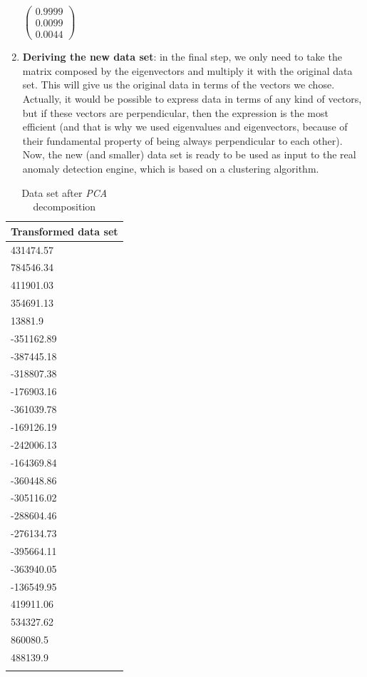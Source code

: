 \documentclass[12pt,a4paper,cucitura]{toptesi}
\begin{document}
\begin{enumerate}
\begin{center} 
$\begin{pmatrix}
0.9999 \\
0.0099 \\
0.0044
\end{pmatrix} $
\end{center}

\item \textbf{Deriving the new data set}: in the final step, we only need to take the matrix composed by the eigenvectors and multiply it with the original data set. 
This will give us the original data in terms of the vectors we chose.
Actually, it would be possible to express data in terms of any kind of vectors, but if these vectors are perpendicular, then the expression is the most efficient (and that is why we used eigenvalues and eigenvectors, because of their fundamental property of being always perpendicular to each other).
Now, the new (and smaller) data set is ready to be used as input to the real anomaly detection engine, which is based on a clustering algorithm.
\end{enumerate}

\begin{center}
\begin{longtable}{|p{3cm}|}
\hline
\textbf{Transformed data set} \\ 
\hline
\hline
431474.57 \\
\hline
784546.34 \\
\hline
411901.03 \\
\hline
354691.13 \\
\hline
13881.9 \\
\hline
-351162.89 \\
\hline
-387445.18 \\
\hline
-318807.38 \\
\hline
-176903.16 \\
\hline
-361039.78 \\
\hline
-169126.19 \\
\hline
-242006.13 \\
\hline
-164369.84 \\
\hline
-360448.86 \\
\hline
-305116.02 \\
\hline
-288604.46 \\
\hline
-276134.73 \\
\hline
-395664.11 \\
\hline
-363940.05 \\
\hline
-136549.95 \\
\hline
419911.06 \\
\hline
534327.62 \\
\hline
860080.5 \\
\hline
488139.9 \\
\hline
\caption{Data set after \emph{PCA} decomposition}
\end{longtable}
\end{center}
\end{document}
